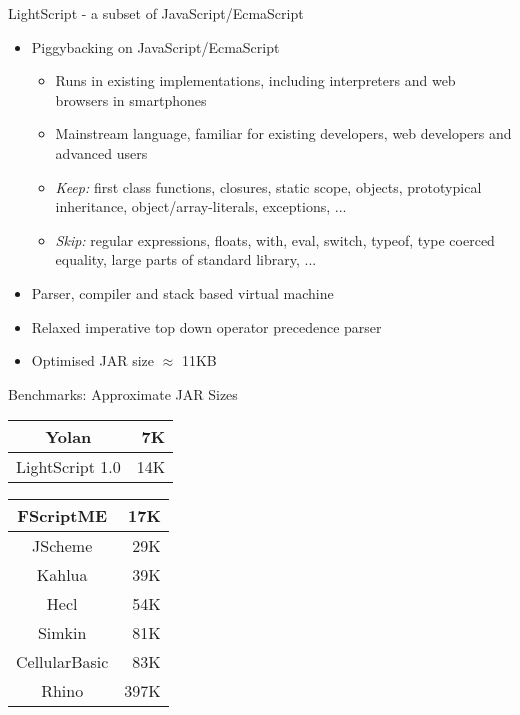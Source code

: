 \documentclass[a4paper,landscape]{slides}
\begin{document}
\begin{slide}
	{\large 
            LightScript - a subset of JavaScript/EcmaScript 
            }
	\begin{itemize} %
\setlength{\itemsep}{-2mm}
        \item Piggybacking on JavaScript/EcmaScript
	\begin{itemize} \setlength{\itemsep}{0mm}
            \item Runs in existing implementations, including interpreters and web browsers in smartphones
            \item Mainstream language, familiar for existing developers, web developers and advanced users
            \item \emph{Keep:} first class functions, closures, static scope, objects, prototypical inheritance, object/array-literals, exceptions, ...
            \item \emph{Skip:} regular expressions, floats, with, eval, switch, typeof, type coerced equality, large parts of standard library, ...
	\end{itemize}
            \item Parser, compiler and stack based virtual machine
            \item Relaxed imperative top down operator precedence parser
            \item Optimised JAR size $\approx$ 11KB
        \end{itemize}
\end{slide}

\begin{slide}
	{\large 
            Benchmarks: Approximate JAR Sizes
	\\ \mbox{}}
        \begin{center}
        \begin{tabular}{|c|r|} \hline
        Yolan & 7K \\ \hline
        LightScript 1.0 & 14K \\ \hline
        \end{tabular}
        \begin{tabular}{|c|r|} \hline
        FScriptME & 17K \\ \hline
        JScheme & 29K \\ \hline
        Kahlua & 39K \\ \hline
        Hecl & 54K \\ \hline
        Simkin & 81K \\ \hline
        CellularBasic & 83K \\ \hline
        Rhino & 397K \\ \hline
        \end{tabular}
        \end{center}
\end{slide}
\end{document}
